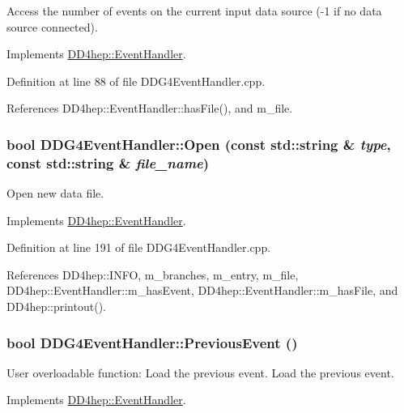 Access the number of events on the current input data source (-\/1 if no data source connected). 

Implements \hyperlink{class_d_d4hep_1_1_event_handler_a005436bba029439b513645485e3c0ff5}{DD4hep::EventHandler}.

Definition at line 88 of file DDG4EventHandler.cpp.

References DD4hep::EventHandler::hasFile(), and m\_\-file.\hypertarget{class_d_d4hep_1_1_d_d_g4_event_handler_a110e487b2813985f56058382357f0754}{
\subsubsection[{Open}]{\setlength{\rightskip}{0pt plus 5cm}bool DDG4EventHandler::Open (const std::string \& {\em type}, \/  const std::string \& {\em file\_\-name})}}
\label{class_d_d4hep_1_1_d_d_g4_event_handler_a110e487b2813985f56058382357f0754}


Open new data file. 

Implements \hyperlink{class_d_d4hep_1_1_event_handler_a90995d3b610beee9d9f7fafcc060626b}{DD4hep::EventHandler}.

Definition at line 191 of file DDG4EventHandler.cpp.

References DD4hep::INFO, m\_\-branches, m\_\-entry, m\_\-file, DD4hep::EventHandler::m\_\-hasEvent, DD4hep::EventHandler::m\_\-hasFile, and DD4hep::printout().\hypertarget{class_d_d4hep_1_1_d_d_g4_event_handler_a20cafa8eac655886d4a3d69338e7e947}{
\subsubsection[{PreviousEvent}]{\setlength{\rightskip}{0pt plus 5cm}bool DDG4EventHandler::PreviousEvent ()}}
\label{class_d_d4hep_1_1_d_d_g4_event_handler_a20cafa8eac655886d4a3d69338e7e947}


User overloadable function: Load the previous event. Load the previous event. 

Implements \hyperlink{class_d_d4hep_1_1_event_handler_a0942608bebbdd107c9dedbdc7311791f}{DD4hep::EventHandler}.

